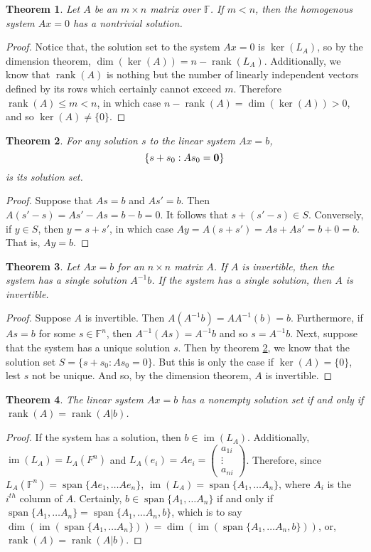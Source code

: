 \documentclass[oneside, 12pt]{book}
\DeclareMathOperator{\rank}{rank}
\DeclareMathOperator{\spn}{span}
\DeclareMathOperator{\im}{im}
\newtheorem{thm}{Theorem}[section]
\theoremstyle{definition}
\begin{document}
\begin{thm}
\label{thm_homsoln}
Let $A$ be an $m \times n$ matrix over $\mathbb{F}$. If $m<n$, then the homogenous system $Ax=0$ has a nontrivial solution.
\end{thm}
\begin{proof}
  Notice that, the solution set to the system $Ax=0$ is $\ker(L_{A})$, so by the dimension theorem, $\dim(\ker(A))=n-\rank(L_{A})$. Additionally,
  we know that $\rank(A)$ is nothing but the number of linearly independent vectors defined by its rows which certainly cannot exceed $m$. Therefore
  $\rank(A) \leq m < n$, in which case $n-\rank(A)=\dim(\ker(A))>0$, and so $\ker(A)\neq \{0 \}$.
\end{proof}
\begin{thm}
\label{thm_gensoln}
For any solution $s$ to the linear system $Ax=b$, \[\{s+s_{0}:As_{0}=\bold{0} \}\] is its solution set.
\end{thm}
\begin{proof}
Suppose that $As=b$ and $As'=b$. Then $A(s'-s)=As'-As=b-b=0$. It follows that $s+(s'-s) \in S$. Conversely, if $y \in S$, then $y=s+s'$, in which case $Ay=A(s+s')=As+As'=b+0=b$. That is, $Ay=b$.
\end{proof}
\begin{thm}
\label{thm_uniqsoln}
  Let $Ax=b$ for an $n \times n$ matrix $A$. If $A$ is invertible, then the system has a single solution $A^{-1}b$. If the system has a single solution, then $A$ is invertible.
\end{thm}
\begin{proof}
Suppose $A$ is invertible. Then $A(A^{-1}b)=AA^{-1}(b)=b$. Furthermore, if $As=b$ for some $s \in \mathbb{F}^{n}$, then $A^{-1}(As)=A^{-1}b$ and so $s=A^{-1}b$.
Next, suppose that the system has a unique solution $s$. Then by theorem \ref{thm_gensoln}, we know that the solution set $S=\{s+s_{0}: As_{0}=0 \}$. But this is only the case if $\ker(A)=\{0\}$, lest $s$ not be unique. And so, by the dimension theorem, $A$ is invertible.
\end{proof}
\begin{thm}
\label{thm_nonemsoln}
The linear system $Ax=b$ has a nonempty solution set if and only if $\rank(A)=\rank(A|b)$.
\end{thm}
\begin{proof}
  If the system has a solution, then $b \in \im(L_{A})$. Additionally, $\im(L_{A})=L_{A}(F^{n})$ and $L_{A}(e_{i})=Ae_{i}=
  \begin{pmatrix} a_{1i} \\ \vdots \\ a_{ni}   \end{pmatrix}$. Therefore, since $L_{A}(\mathbb{F}^{n})= \spn \{Ae_{1}, \dots Ae_{n}\}$,
  $\im(L_{A})=\spn\{A_{1}, \dots A_{n}\}$, where $A_{i}$ is the $i^{th}$ column of $A$.
  Certainly, $b \in \spn\{A_{1}, \dots A_{n}\}$ if and only if $\spn\{A_{1}, \dots A_{n}\}=\spn\{A_{1}, \dots A_{n}, b\}$, which is to say
  $\dim(\im(\spn\{A_{1}, \dots A_{n}\}))=\dim(\im(\spn\{A_{1}, \dots A_{n}, b\}))$, or, $\rank(A)=\rank(A|b)$.
\end{proof}
\end{document}
